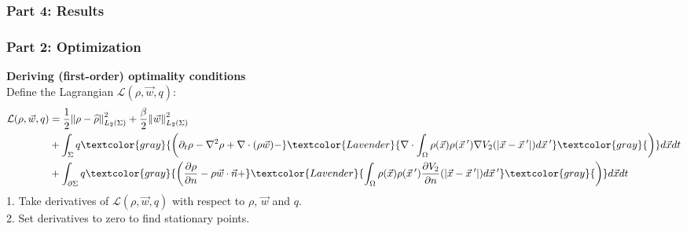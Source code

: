 \documentclass[aspectratio=169,xcolor=dvipsnames]{beamer}
\begin{document}
\begin{frame}
	\frametitle{Part 4: Results}
	
\end{frame}
\begin{frame}
	\frametitle{Part 2: Optimization}
	\textbf{Deriving (first-order) optimality conditions}\\
	Define the Lagrangian $\mathcal{L}(\rho, \vec{w}, q)$:
	\begin{align*}
		\mathcal{L}(\rho, \vec{w},q)&= \frac{1}{2}\norm{\rho- \widehat{\rho}}_{L_2(\Sigma)}^2 + \frac{\beta}{2} \norm{\vec{w}}_{L_2(\Sigma)}^2\\
		&+ \int_\Sigma q \textcolor{gray}{\bigg( \partial_t \rho - \nabla^2 \rho + \nabla \cdot (\rho \vec{w})
			-}\textcolor{Lavender}{ \nabla \cdot\int_\Omega \rho(\vec{x}) \rho(\vec{x}\hspace{0.2em}') \nabla V_2(|\vec{x}-\vec{x}\hspace{0.2em}'|)d\vec{x}\hspace{0.2em}'}  \textcolor{gray}{  \bigg)} d\vec{x} dt\\
		&+ \int_{\partial \Sigma} q \textcolor{gray}{ \bigg(\frac{\partial \rho}{\partial n} - \rho \vec{w} \cdot \vec{n} + }\textcolor{Lavender}{ \int_\Omega \rho(\vec{x}) \rho(\vec{x}\hspace{0.2em}')  \frac{ \partial  V_2}{\partial n}(|\vec{x}-\vec{x}\hspace{0.2em}'|)d\vec{x}\hspace{0.2em}'} \textcolor{gray}{\bigg)} d\vec{x} dt\\
	\end{align*}
	1. Take derivatives of $\mathcal{L}(\rho, \vec{w}, q)$ with respect to $\rho$, $\vec{w}$ and $q$. \\
	2. Set derivatives to zero to find stationary points. \\
\end{frame}
\end{document}
